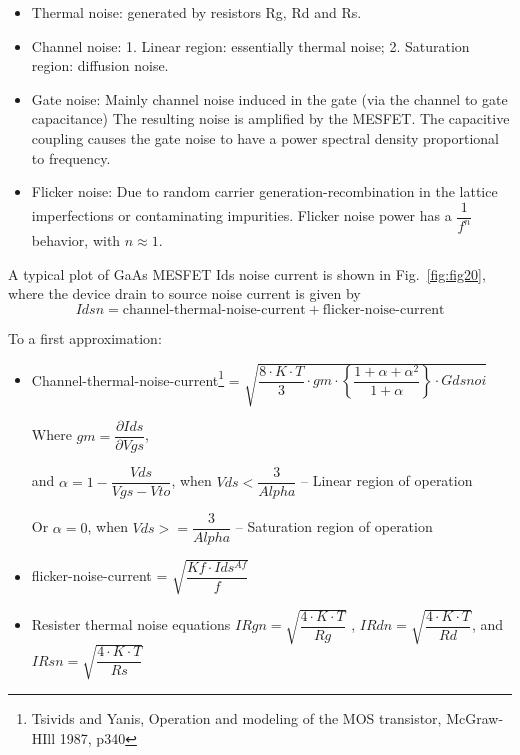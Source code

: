 \begin{itemize}
 \item Thermal noise: generated by resistors Rg, Rd and Rs.
 \item Channel noise: 1. Linear region: essentially thermal noise; 2. Saturation region: diffusion noise.
 \item Gate noise:  Mainly channel noise induced in the gate (via the channel to gate capacitance) The resulting noise is amplified by the MESFET. The capacitive coupling causes the gate noise to have a power spectral density proportional to frequency.
 \item Flicker noise: Due to random carrier generation-recombination in the lattice imperfections or contaminating impurities. Flicker noise power has a $\dfrac{1}{f^{n}}$ behavior, with $n \approx 1.$

\end{itemize}
A typical plot of GaAs MESFET Ids noise current is shown in
Fig.~\ref{fig:fig20}, where the device drain to source noise current
is given by
\begin{equation}
 Idsn = \textrm{channel-thermal-noise-current} + \textrm{flicker-noise-current}
\end{equation}

To a first approximation:
\begin{itemize}
 \item Channel-thermal-noise-current\footnote{Tsivids and Yanis, Operation and modeling of the MOS transistor, McGraw-HIll 1987, p340} = $\sqrt{\dfrac{8 \cdot K \cdot T}{3} \cdot gm \cdot \left\lbrace \dfrac{1+ \alpha + \alpha^{2}}{1+\alpha} \right\rbrace  \cdot Gdsnoi} $


Where $gm = \dfrac{\partial Ids}{\partial Vgs}$,


and  $\alpha = 1 -\dfrac{Vds}{Vgs-Vto}$, when $Vds < \dfrac{3}{Alpha} $ -- Linear region of operation


Or \hspace{1mm}    $\alpha = 0$, when  $ Vds >= \dfrac{3}{Alpha} $ -- Saturation region of operation

\item flicker-noise-current = $\sqrt{\dfrac{Kf \cdot Ids^{Af}}{f}}$

\item Resister thermal noise equations $IRgn = \sqrt{\dfrac{4 \cdot K \cdot T}{Rg}}$ , $IRdn = \sqrt{\dfrac{4 \cdot K \cdot T}{Rd}}$, and
$IRsn = \sqrt{\dfrac{4 \cdot K \cdot T}{Rs}}$
\end{itemize}


